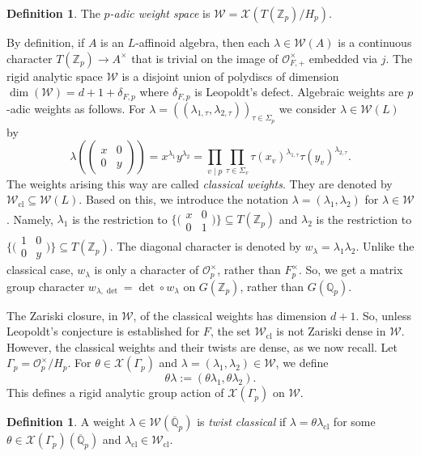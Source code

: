 \documentclass[10pt, twoside]{amsart}
\theoremstyle{plain}
\theoremstyle{definition}
\newtheorem{definition}[theorem]{Definition}
\theoremstyle{remark}
\numberwithin{equation}{subsection}
\def\Q{\mathbb Q}
\def\Z{\mathbb Z}
\def\scro{\mathscr O}
\def\scro{\mathscr O}
\def\scrw{\mathscr W}
\def\scrx{\mathscr X}
\def\cl{\mathrm{cl}}
\def\qpbar{\overline{\mathbb Q}_p}
\newcommand{\mat}[4]{\begin{pmatrix}#1&#2\\#3&#4\end{pmatrix}}
\newcommand{\smallmat}[4]{\bigl(\begin{smallmatrix}#1&#2\\#3&#4\end{smallmatrix}\bigr)}
\begin{document}
\begin{definition}\label{defn:weight-space}
The \emph{$p$-adic weight space} is $\scrw = \scrx\left(T(\Z_p)/H_p\right)$.
\end{definition}
By definition, if $A$ is an $L$-affinoid algebra, then each $\lambda \in \scrw(A)$ is a continuous character $T(\Z_p)\rightarrow A^\times$ that is trivial on the image of $\scro_{F,+}^\times$ embedded via $j$. The rigid analytic space $\scrw$ is a disjoint union of polydiscs of dimension $\dim(\scrw) = d + 1 + \delta_{F,p}$ where $\delta_{F,p}$ is Leopoldt's defect. Algebraic weights are $p$-adic weights as follows. For $\lambda = ((\lambda_{1,\tau},\lambda_{2,\tau}))_{\tau \in \Sigma_p}$ we consider $\lambda \in \scrw(L)$ by
\begin{equation*}
\lambda\left(\mat x00y \right) = x^{\lambda_1}y^{\lambda_2} = \prod_{v \mid p} \prod_{\tau \in \Sigma_v} \tau(x_v)^{\lambda_{1,\tau}}\tau(y_v)^{\lambda_{2,\tau}}.
\end{equation*}
The weights arising this way are called {\em classical weights}. They are denoted by $\scrw_\mathrm{cl} \subseteq \scrw(L)$.  Based on this, we introduce the notation $\lambda = (\lambda_1,\lambda_2)$ for $\lambda \in \scrw$. Namely, $\lambda_1$ is the restriction to $\{\smallmat x001\} \subseteq T(\Z_p)$ and $\lambda_2$ is the restriction to $\{\smallmat 100y\} \subseteq T(\Z_p)$. The diagonal character is denoted by $w_{\lambda} = \lambda_1\lambda_2$. Unlike the classical case, $w_\lambda$ is only a character of $\scro_p^\times$, rather than $F_p^\times$. So, we get a matrix group character $w_{\lambda,\det} = {\det}\circ w_\lambda$ on $G(\Z_p)$, rather than $G(\Q_p)$. 

The Zariski closure, in $\scrw$, of the classical weights has dimension $d+1$. So, unless Leopoldt's conjecture is established for $F$, the set $\scrw_{\cl}$ is not Zariski dense in $\scrw$. However, the classical weights and their twists are dense, as we now recall. Let ${\Gamma}_p = \scro_p^\times/H_p$. For $\theta \in \scrx(\Gamma_p)$ and $\lambda = (\lambda_1,\lambda_2) \in \scrw$, we define
$$
\theta \lambda := (\theta \lambda_1,\theta \lambda_2).
$$
This defines a rigid analytic group action of $\scrx(\Gamma_p)$ on $\scrw$.

\begin{definition}\label{defn:twist-classical}
A weight $\lambda \in \scrw(\qpbar)$ is \emph{twist classical} if $\lambda = \theta \lambda_{\cl}$ for some $\theta \in \scrx({\Gamma}_p)(\qpbar)$ and $\lambda_{\cl} \in \scrw_{\mathrm{cl}}$.
\end{definition}
\end{document}
